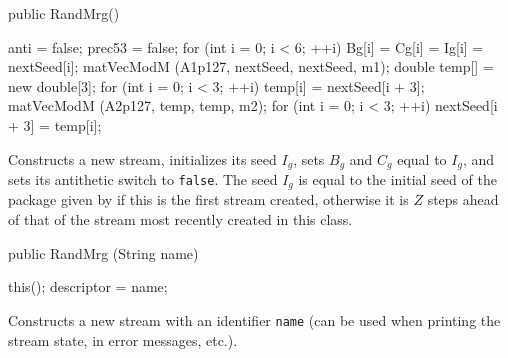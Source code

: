 \begin{code}

   public RandMrg() \begin{hide} {
      anti = false;
      prec53 = false;
      for (int i = 0; i < 6; ++i)  
         Bg[i] = Cg[i] = Ig[i] = nextSeed[i];
      matVecModM (A1p127, nextSeed, nextSeed, m1);
      double temp[] = new double[3];
      for (int i = 0; i < 3; ++i)  
         temp[i] = nextSeed[i + 3];
      matVecModM (A2p127, temp, temp, m2);
      for (int i = 0; i < 3; ++i)  
         nextSeed[i + 3] = temp[i];
   }\end{hide}
\end{code}
 \begin{tabb} Constructs a new stream, initializes its seed $I_g$,
   sets $B_g$ and $C_g$ equal to $I_g$, and sets its antithetic switch 
   to \texttt{false}.
   The seed $I_g$ is equal to the initial seed of the package given by 
    if this is the first stream created,
   otherwise it is $Z$ steps ahead of that of the stream most recently
   created in this class.
 \end{tabb}
\begin{code}

   public RandMrg (String name) \begin{hide} {
      this();
      descriptor = name;
   }\end{hide}
\end{code}
 \begin{tabb}  Constructs a new stream with an identifier \texttt{name}
   (can be used when printing the stream state, in error messages, etc.).
 \end{tabb}
\begin{htmlonly}
\end{htmlonly}
 

